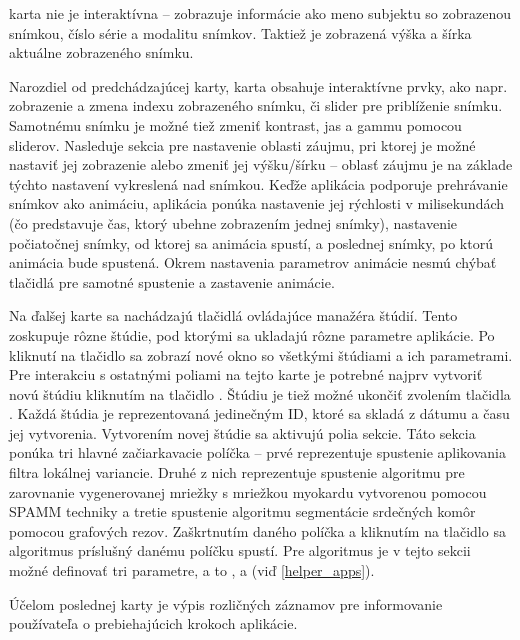 { karta nie je interaktívna -- zobrazuje informácie ako meno subjektu so zobrazenou snímkou, číslo série a modalitu snímkov. Taktiež je zobrazená výška a šírka aktuálne zobrazeného snímku.

Narozdiel od predchádzajúcej karty,  karta obsahuje interaktívne prvky, ako napr. zobrazenie a zmena indexu zobrazeného snímku, či slider pre priblíženie snímku. Samotnému snímku je možné tiež zmeniť kontrast, jas a gammu pomocou sliderov. Nasleduje sekcia pre nastavenie  oblasti záujmu, pri ktorej je možné nastaviť jej zobrazenie alebo zmeniť jej výšku/šírku -- oblasť záujmu je na základe týchto nastavení vykreslená nad snímkou. Keďže aplikácia podporuje prehrávanie snímkov ako animáciu, aplikácia ponúka nastavenie jej rýchlosti v milisekundách (čo predstavuje čas, ktorý ubehne zobrazením jednej snímky), nastavenie počiatočnej snímky, od ktorej sa animácia spustí, a poslednej snímky, po ktorú animácia bude spustená. Okrem nastavenia parametrov animácie nesmú chýbať tlačidlá pre samotné spustenie a zastavenie animácie.

Na ďalšej karte  sa nachádzajú tlačidlá ovládajúce manažéra štúdií. Tento  zoskupuje rôzne štúdie, pod ktorými sa ukladajú rôzne parametre aplikácie. Po kliknutí na tlačidlo  sa zobrazí nové okno so všetkými štúdiami a ich parametrami.
Pre interakciu s ostatnými poliami na tejto karte je potrebné najprv vytvoriť novú štúdiu kliknutím na tlačidlo . \newline Štúdiu je tiež možné ukončiť zvolením tlačidla . Každá štúdia je reprezentovaná jedinečným ID, ktoré sa skladá z dátumu a času jej vytvorenia.
Vytvorením novej štúdie sa aktivujú polia  sekcie. Táto sekcia ponúka tri hlavné začiarkavacie políčka -- prvé reprezentuje spustenie aplikovania filtra lokálnej variancie. Druhé z nich reprezentuje spustenie algoritmu pre zarovnanie vygenerovanej mriežky s mriežkou myokardu vytvorenou pomocou SPAMM techniky a tretie spustenie algoritmu segmentácie srdečných komôr pomocou grafových rezov. Zaškrtnutím daného políčka a kliknutím na tlačidlo  sa algoritmus príslušný danému políčku spustí. Pre  algoritmus je v tejto sekcii možné definovať tri parametre, a to ,  a  (viď \ref{helper_apps}).

Účelom poslednej karty  je výpis rozličných záznamov pre informovanie používateľa o prebiehajúcich krokoch aplikácie. \clearpage

}
